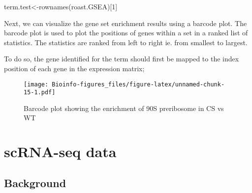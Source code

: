\documentclass[
  openany]{book}
\newenvironment{Shaded}{\begin{snugshade}}{\end{snugshade}}
\newcommand{\AttributeTok}[1]{\textcolor[rgb]{0.77,0.63,0.00}{#1}}
\newcommand{\DecValTok}[1]{\textcolor[rgb]{0.00,0.00,0.81}{#1}}
\newcommand{\FunctionTok}[1]{\textcolor[rgb]{0.00,0.00,0.00}{#1}}
\newcommand{\NormalTok}[1]{#1}
\newcommand{\OtherTok}[1]{\textcolor[rgb]{0.56,0.35,0.01}{#1}}
\newcommand{\SpecialCharTok}[1]{\textcolor[rgb]{0.00,0.00,0.00}{#1}}
\newcommand{\StringTok}[1]{\textcolor[rgb]{0.31,0.60,0.02}{#1}}
\begin{document}
\begin{Shaded}
\begin{Highlighting}[]
\NormalTok{term.test}\OtherTok{\textless{}{-}}\FunctionTok{rownames}\NormalTok{(roast.GSEA)[}\DecValTok{1}\NormalTok{]}
\end{Highlighting}
\end{Shaded}

Next, we can visualize the gene set enrichment results using a barcode plot. The barcode plot is used to plot the positions of genes within a set in a ranked list of statistics. The statistics are ranked from left to right ie. from smallest to largest.

To do so, the gene identified for the term should first be mapped to the index position of each gene in the expression matrix;

\begin{Shaded}
\end{Shaded}

\begin{figure}
\centering
\texttt{[image: Bioinfo-figures\_files/figure-latex/unnamed-chunk-15-1.pdf]}
\caption{\label{fig:unnamed-chunk-15}Barcode plot showing the enrichment of 90S preribosome in CS vs WT}
\end{figure}

\vspace{-100pt}

\vspace{-100pt}

\hypertarget{scrna-seq-data}{%
\chapter{scRNA-seq data}\label{scrna-seq-data}}

\hypertarget{background-1}{%
\section{Background}\label{background-1}}
\end{document}
